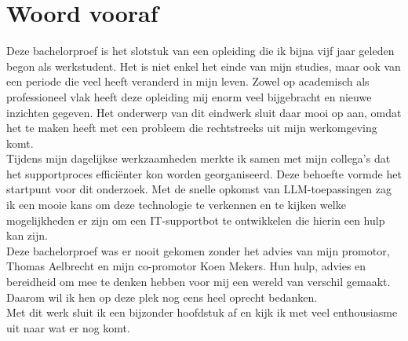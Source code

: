 
\chapter{Woord vooraf}
\label{ch:voorwoord}

Deze bachelorproef is het slotstuk van een opleiding die ik bijna vijf jaar geleden begon als werkstudent. Het is niet enkel het einde van mijn studies, maar ook van een periode die veel heeft veranderd in mijn leven. Zowel op academisch als professioneel vlak heeft deze opleiding mij enorm veel bijgebracht en nieuwe inzichten gegeven. Het onderwerp van dit eindwerk sluit daar mooi op aan, omdat het te maken heeft met een probleem die rechtstreeks uit mijn werkomgeving komt.
\\[1em]
Tijdens mijn dagelijkse werkzaamheden merkte ik samen met mijn collega’s dat het supportproces efficiënter kon worden georganiseerd. Deze behoefte vormde het startpunt voor dit onderzoek. Met de snelle opkomst van LLM-toepassingen zag ik een mooie kans om deze technologie te verkennen en te kijken welke mogelijkheden er zijn om een IT-supportbot te ontwikkelen die hierin een hulp kan zijn.
\\[1em]
Deze bachelorproef was er nooit gekomen zonder het advies van mijn promotor, Thomas Aelbrecht en mijn co-promotor Koen Mekers. Hun hulp, advies en bereidheid om mee te denken hebben voor mij een wereld van verschil gemaakt. Daarom wil ik hen op deze plek nog eens heel oprecht bedanken.
\\[1em]
Met dit werk sluit ik een bijzonder hoofdstuk af en kijk ik met veel enthousiasme uit naar wat er nog komt.




